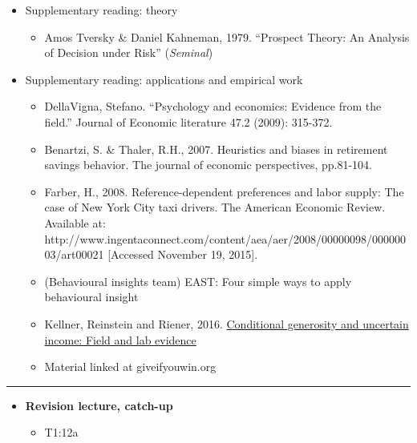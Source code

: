 \documentclass[]{article}
\providecommand{\tightlist}{%
  \setlength{\itemsep}{0pt}\setlength{\parskip}{0pt}}
\begin{document}
\begin{itemize}
\tightlist
\item
  Supplementary reading: theory

  \begin{itemize}
  \tightlist
  \item
    Amos Tversky \& Daniel Kahneman, 1979. ``Prospect Theory: An
    Analysis of Decision under Risk'' (\emph{Seminal})
  \end{itemize}
\item
  Supplementary reading: applications and empirical work

  \begin{itemize}
  \tightlist
  \item
    DellaVigna, Stefano. ``Psychology and economics: Evidence from the
    field.'' Journal of Economic literature 47.2 (2009): 315-372.
  \item
    Benartzi, S. \& Thaler, R.H., 2007. Heuristics and biases in
    retirement savings behavior. The journal of economic perspectives,
    pp.81-104.
  \item
    Farber, H., 2008. Reference-dependent preferences and labor supply:
    The case of New York City taxi drivers. The American Economic
    Review. Available at:
    http://www.ingentaconnect.com/content/aea/aer/2008/00000098/00000003/art00021
    {[}Accessed November 19, 2015{]}.
  \item
    (Behavioural insights team) EAST: Four simple ways to apply
    behavioural insight
  \item
    Kellner, Reinstein and Riener, 2016.
    \href{https://dl.dropboxusercontent.com/u/91553/Giving_and_Probability.pdf}{Conditional
    generosity and uncertain income: Field and lab evidence}
  \item
    Material linked at giveifyouwin.org
  \end{itemize}
\end{itemize}

\begin{center}\rule{0.5\linewidth}{\linethickness}\end{center}

\begin{itemize}
\tightlist
\item
  \textbf{Revision lecture, catch-up}

  \begin{itemize}
  \tightlist
  \item
    T1:12a
  \end{itemize}
\end{itemize}
\end{document}
